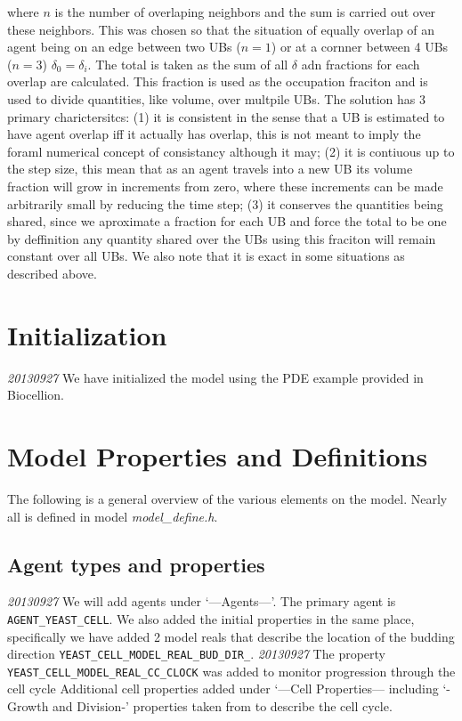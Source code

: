 \documentclass{article}
\begin{document}
where $n$ is the number of overlaping neighbors and the sum is carried out over these neighbors.
This was chosen so that the situation of equally overlap of an agent being on an edge between two UBs ($n=1$) or 
at a cornner between 4 UBs ($n=3$) $\delta_0=\delta_i$.
The total is taken as the sum of all $\delta$ adn fractions for each overlap are calculated.
This fraction is used as the occupation fraciton and is used to divide quantities, like volume, over multpile UBs.
The solution has 3 primary charictersitcs: 
(1) it is consistent in the sense that a UB is estimated to have agent overlap iff it actually has overlap,
this is not meant to imply the foraml numerical concept of consistancy although it may;
(2) it is contiuous up to the step size, this mean that as an agent travels into a new UB 
its volume fraction will grow in increments from zero, 
where these increments can be made arbitrarily small by reducing the time step;
(3) it conserves the quantities being shared, 
since we aproximate a fraction for each UB and force the total to be one by deffinition 
any quantity shared over the UBs using this fraciton will remain constant over all UBs.
We also note that it is exact in some situations as described above.
 


\section{Initialization}
\emph{20130927} We have initialized the model using the PDE example provided in Biocellion.

\section{Model Properties and Definitions}
The following is a general overview of the various elements on the model.
Nearly all is defined in model \textit{model\_define.h}.

\subsection{Agent types and properties}
\emph{20130927} We will add agents under `---Agents---'.
The primary agent is \texttt{AGENT\_YEAST\_CELL}.
We also added the initial properties in the same place,
specifically we have added 2 model reals that describe the 
location of the budding direction \texttt{YEAST\_CELL\_MODEL\_REAL\_BUD\_DIR\_}.
\emph{20130927} The property \texttt{YEAST\_CELL\_MODEL\_REAL\_CC\_CLOCK}
was added to monitor progression through the cell cycle \cite{Charvin2009}
Additional cell properties added under `---Cell Properties--- including 
`-Growth and Division-' properties taken from \cite{Charvin2009} to describe the cell cycle.
\end{document}

